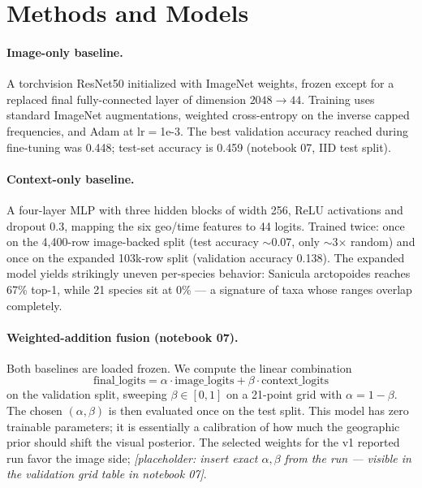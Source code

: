 \documentclass[11pt]{article}
\begin{document}
\section{Methods and Models}

\paragraph{Image-only baseline.} A torchvision ResNet50 initialized with ImageNet weights, frozen except for a replaced final fully-connected layer of dimension $2048 \rightarrow 44$. Training uses standard ImageNet augmentations, weighted cross-entropy on the inverse capped frequencies, and Adam at lr$=$1e-3. The best validation accuracy reached during fine-tuning was 0.448; test-set accuracy is 0.459 (notebook 07, IID test split).

\paragraph{Context-only baseline.} A four-layer MLP with three hidden blocks of width 256, ReLU activations and dropout 0.3, mapping the six geo/time features to 44 logits. Trained twice: once on the 4{,}400-row image-backed split (test accuracy $\sim$0.07, only $\sim$3$\times$ random) and once on the expanded 103k-row split (validation accuracy 0.138). The expanded model yields strikingly uneven per-species behavior: Sanicula arctopoides reaches 67\% top-1, while 21 species sit at 0\% --- a signature of taxa whose ranges overlap completely.

\paragraph{Weighted-addition fusion (notebook 07).} Both baselines are loaded frozen. We compute the linear combination
\[
\text{final\_logits} = \alpha \cdot \text{image\_logits} + \beta \cdot \text{context\_logits}
\]
on the validation split, sweeping $\beta \in [0,1]$ on a 21-point grid with $\alpha = 1 - \beta$. The chosen $(\alpha, \beta)$ is then evaluated once on the test split. This model has zero trainable parameters; it is essentially a calibration of how much the geographic prior should shift the visual posterior. The selected weights for the v1 reported run favor the image side; \textit{[placeholder: insert exact $\alpha, \beta$ from the run --- visible in the validation grid table in notebook 07]}.
\end{document}
